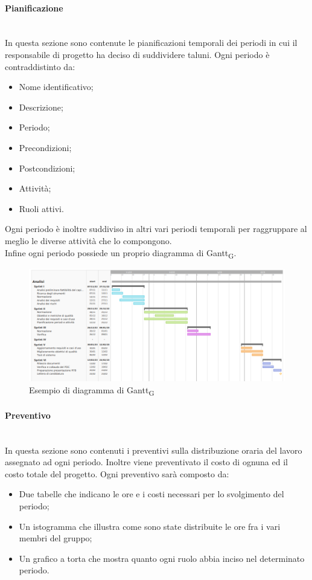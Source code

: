 \paragraph {Pianificazione}\mbox{}\\
In questa sezione sono contenute le pianificazioni temporali dei periodi in cui il responsabile di progetto ha deciso di suddividere taluni.
Ogni periodo è contraddistinto da:
\begin{itemize}
	\item Nome identificativo;
	\item Descrizione;
	\item Periodo;
	\item Precondizioni;
	\item Postcondizioni;
	\item Attività;
	\item Ruoli attivi.
\end{itemize}
Ogni periodo è inoltre suddiviso in altri vari periodi temporali per raggruppare al meglio le diverse attività che lo compongono.\\
Infine ogni periodo possiede un proprio diagramma di Gantt\textsubscript{G}.
\begin{figure}[h!]
	\centering
	\includegraphics[width=15cm]{img/4_analisi.png}
	\caption{Esempio di diagramma di Gantt\textsubscript{G}}
\end{figure}
\paragraph {Preventivo}\mbox{}\\
In questa sezione sono contenuti i preventivi sulla distribuzione oraria del lavoro assegnato ad ogni periodo. Inoltre viene preventivato il costo di ognuna ed il costo totale del progetto. Ogni preventivo sarà composto da:
\begin{itemize}
	\item Due tabelle che indicano le ore e i costi necessari per lo svolgimento del periodo;
	\item Un istogramma che illustra come sono state distribuite le ore fra i vari membri del gruppo;
	\item Un grafico a torta che mostra quanto ogni ruolo abbia inciso nel determinato periodo.
\end{itemize}
